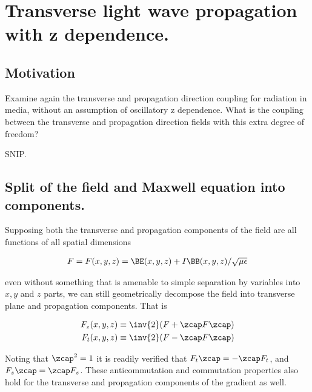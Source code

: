 

\chapter{Transverse light wave propagation with z dependence.}
\label{chap:maxwellHomoFirstOrder}
{}
\date{Aug 9, 2009}

\beginArtWithToc

\section{Motivation}

Examine again the transverse and propagation direction coupling for radiation in media, without an assumption of oscillatory z dependence.  What is the coupling between the transverse and propagation direction fields with this extra degree of freedom?

SNIP.
\section{Split of the field and Maxwell equation into components.}

Supposing both the transverse and propagation components of the field are all functions of all spatial dimensions

\begin{align}\label{eqn:foo4}
F = F(x,y,z) = \BE(x,y,z) + I\BB(x,y,z)/\sqrt{\mu\epsilon}
\end{align}

even without something that is amenable to simple separation by variables into $x,y$ and $z$ parts, we can still geometrically decompose the field into transverse plane and propagation components.  That is

\begin{align}\label{eqn:foo5}
F_z(x,y,z) &\equiv \inv{2}(F + \zcap F \zcap) \\
F_t(x,y,z) &\equiv \inv{2}(F - \zcap F \zcap)
\end{align}

Noting that $\zcap^2 = 1$ it is readily verified that $F_t \zcap = - \zcap F_t$, and $F_z \zcap = \zcap F_z$.  These anticommutation and commutation properties also hold for the transverse and propagation components of the gradient as well.

